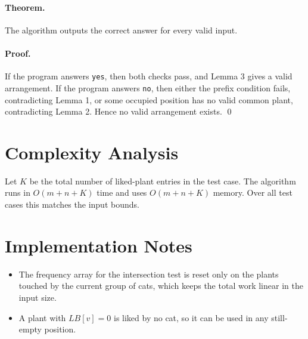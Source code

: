 \documentclass[11pt]{article}
\begin{document}
\paragraph{Theorem.}
The algorithm outputs the correct answer for every valid input.

\paragraph{Proof.}
If the program answers \texttt{yes}, then both checks pass, and Lemma 3 gives a valid arrangement.
If the program answers \texttt{no}, then either the prefix condition fails, contradicting Lemma 1, or some
occupied position has no valid common plant, contradicting Lemma 2. Hence no valid arrangement
exists. \qed

\section*{Complexity Analysis}

Let $K$ be the total number of liked-plant entries in the test case. The algorithm runs in $O(m+n+K)$
time and uses $O(m+n+K)$ memory. Over all test cases this matches the input bounds.

\section*{Implementation Notes}

\begin{itemize}[leftmargin=*]
    \item The frequency array for the intersection test is reset only on the plants touched by the current
    group of cats, which keeps the total work linear in the input size.
    \item A plant with $LB[v]=0$ is liked by no cat, so it can be used in any still-empty position.
\end{itemize}
\end{document}
